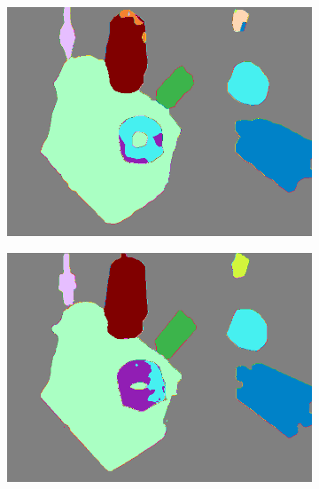 \begin{figure}[h]
\begin{subfigure}{.24\textwidth}
			\includegraphics[width=1\linewidth]{images/sample_predictions/00132_mob_full_pred}
		\end{subfigure}
		\begin{subfigure}{.24\textwidth}
			\centering
			\includegraphics[width=1\linewidth]{images/sample_predictions/00132_xcep_full_pred}
		\end{subfigure}
		\begin{subfigure}{.24\textwidth}
			\centering

\end{subfigure}
\end{figure}

